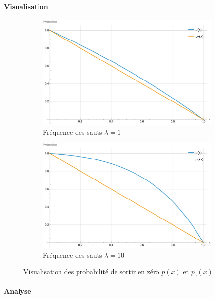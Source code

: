 \paragraph{Visualisation}\phantom{}
\begin{figure}[htb]
    \centering
    \begin{subfigure}{0.49\linewidth}
        \includegraphics[width=\linewidth]{img/validation/Jumps/probability_jumps.pdf}
        \caption{Fréquence des sauts $\lambda=1$}
    \end{subfigure}
    \hfill
    \begin{subfigure}{0.49\linewidth}
        \includegraphics[width=\linewidth]{img/validation/Jumps/probability_big_jumps.pdf}
        \caption{Fréquence des sauts $\lambda=10$}
    \end{subfigure}
    \caption{Visualisation des probabilité de sortir en zéro $p(x)$ et $p_0(x)$}\label{fig:JumpsProbabilityVisualisation}
\end{figure}
\FloatBarrier\paragraph{Analyse}\mbox{}\\
